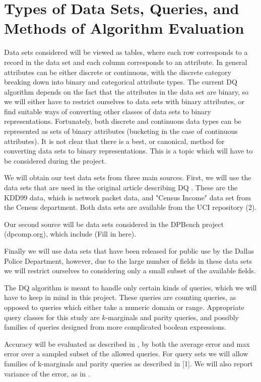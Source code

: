 \documentclass{article}
\begin{document}
\section{Types of Data Sets, Queries, and Methods of Algorithm Evaluation}

Data sets considered will be viewed as tables, where each row corresponds to a record in the data set and each column corresponds to an attribute. In general attributes can be either discrete or continuous, with the discrete category breaking down into binary and categorical attribute types. The current DQ algorithm depends on the fact that the attributes in the data set are binary, so we will either have to restrict ourselves to data sets with binary attributes, or find suitable ways of converting other classes of data sets to binary representations. Fortunately, both discrete and continuous data types can be represented as sets of binary attributes (bucketing in the case of continuous attributes). It is not clear that there is a best, or canonical, method for converting data sets to binary representations. This is a topic which will have to be considered during the project.

We will obtain our test data sets from three main sources. First, we will use the data sets that are used in the original article describing DQ \cite{DBLP:journals-corr-GaboardiAHRW14}. These are the KDD99 data, which is network packet data, and "Census Income" data set from the Census department. Both data sets are available from the UCI repository (2).

Our second source will be data sets considered in the DPBench project (dpcomp.org), which include (Fill in here).

Finally we will use  data sets that have been released for public use by the Dallas Police Department, however, due to the large number of fields in these data sets we will restrict ourselves to considering only a small subset of the available fields.

The DQ algorithm is meant to handle only certain kinds of queries, which we will have to keep in mind in this project. These queries are counting queries, as opposed to queries which either take a numeric domain or range. Appropriate query classes for this study are $k$-marginals and parity queries, and possibly families of queries designed from more complicated boolean expressions.

Accuracy will be evaluated as described in \cite[Pages~16-17]{DBLP:journals-corr-GaboardiAHRW14}, by both the average error and max error over a sampled subset of the allowed queries. For query sets we will allow families of k-marginals and parity queries as described in [1]. We will also report variance of the error, as in \cite{Hay:2016:PED:2882903.2882931}.
\end{document}
